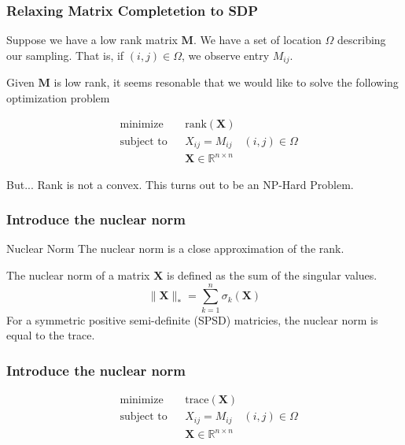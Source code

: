 \documentclass[
	11pt, %
]{beamer}
\begin{document}
\begin{frame}
	\frametitle{Relaxing Matrix Completetion to SDP}
	Suppose we have a low rank matrix $\mathbf{M}$. We have a set of location $\Omega$ describing
	our sampling. That is, if $(i,j) \in \Omega$, we observe entry $M_{ij}$. 
	
	Given $\mathbf{M}$ is low rank, 
	it seems resonable that we would like to solve the following optimization problem
	
	\pause 

	\begin{equation*}
	  \begin{aligned}
	  & {\text{minimize}}
	  & & \text{rank}(\mathbf{X}) \\[1pt]
	  & \text{subject to}
	  & & X_{ij} = M_{ij} \quad (i,j) \in \Omega\\[1pt]
	  &&& \mathbf{X} \in \mathbb{R}^{n \times n}
	  \end{aligned}
	\end{equation*}

	\pause

	\begin{alertblock}{But...}
		Rank is not a convex. This turns out to be an NP-Hard Problem.
	\end{alertblock}
\end{frame}

\begin{frame}
	\frametitle{Introduce the nuclear norm}
	\vspace{-4em}
	\begin{block}{Nuclear Norm}
		The nuclear norm is a close approximation of the rank.
	\end{block}
	\vspace{2em}
	
	The nuclear norm of a matrix $\mathbf{X}$ is defined as the sum of 
	the singular values.
	\[
	\lVert \mathbf{X} \rVert_* = \sum_{k=1}^n \sigma_k ({\mathbf{X}})  
	\]
	\pause
	For a symmetric positive semi-definite (SPSD) matricies, the nuclear norm is equal to the trace. 
\end{frame}

\begin{frame}
	\frametitle{Introduce the nuclear norm}
	\begin{equation*}
		\begin{aligned}
		& {\text{minimize}}
		& & \text{trace}(\mathbf{X}) \\[1pt]
		& \text{subject to}
		& & X_{ij} = M_{ij} \quad (i,j) \in \Omega\\[1pt]
		&&& \mathbf{X} \in \mathbb{R}^{n \times n}
		\end{aligned}
	\end{equation*}	
\end{frame}
\end{document}
